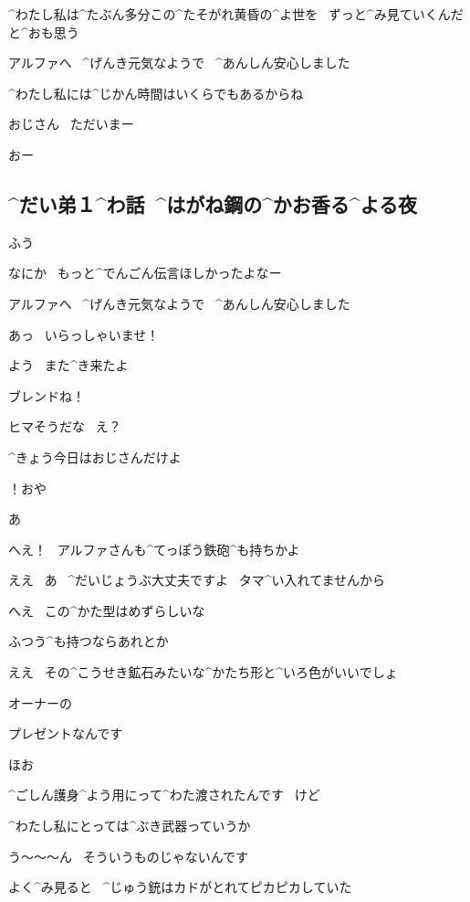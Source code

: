 \Alpha ^{わたし}{私}は^{たぶん}{多分}この^{たそがれ}{黄昏}の^{よ}{世}を
\ ずっと^{み}{見}ていくんだと^{おも}{思}う

\page[24]
\Sign アルファへ
\ ^{げんき}{元気}なようで
\ ^{あんしん}{安心}しました

\Alpha ^{わたし}{私}には^{じかん}{時間}はいくらでもあるからね

\Alpha おじさん
\ ただいまー

\Ojisan おー


\subsection{^{だい}{弟}１^{わ}{話}\ ^{はがね}{鋼}の^{かお}{香}る^{よる}{夜}}

\page[29]
\Alpha ふう

\Alpha なにか
\ もっと^{でんごん}{伝言}ほしかったよなー

\Sign アルファへ
\ ^{げんき}{元気}なようで
\ ^{あんしん}{安心}しました

\Alpha あっ
\ いらっしゃいませ！

\Ojisan よう
\ また^{き}{来}たよ

\Alpha ブレンドね！

\page[30]
\Ojisan ヒマそうだな
\ え？

\Alpha ^{きょう}{今日}はおじさんだけよ

\Ojisan ！おや

\Alpha あ

\Ojisan へえ！
\ アルファさんも^{てっぽう}{鉄砲}^{も}{持}ちかよ

\Alpha ええ
\ あ
\ ^{だいじょうぶ}{大丈夫}ですよ
\ タマ^{い}{入}れてませんから

\Ojisan へえ
\ この^{かた}{型}はめずらしいな

\Ojisan ふつう^{も}{持}つならあれとか

\page[31]
\Ojisan ええ
\ その^{こうせき}{鉱石}みたいな^{かたち}{形}と^{いろ}{色}がいいでしょ

\Alpha オーナーの

\Alpha プレゼントなんです

\Ojisan ほお

\Alpha ^{ごしん}{護身}^{よう}{用}にって^{わた}{渡}されたんです
\ けど

\Alpha ^{わたし}{私}にとっては^{ぶき}{武器}っていうか

\page[32]
\Alpha う〜〜〜ん
\ そういうものじゃないんです

\Ojisan よく^{み}{見}ると
\ ^{じゅう}{銃}はカドがとれてピカピカしていた

